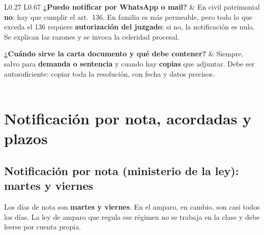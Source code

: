\documentclass[12pt,oneside]{book}
\begin{document}
\begin{longtable}{L{0.27\textwidth} L{0.67\textwidth}}
\textbf{¿Puedo notificar por WhatsApp o mail?} &
En civil patrimonial \textbf{no}: hay que cumplir el art.\ 136. En familia es más permeable, pero todo lo que exceda el 136 requiere \textbf{autorización del juzgado}; si no, la notificación es nula. Se explican las razones y se invoca la celeridad procesal. \\
\addlinespace

\textbf{¿Cuándo sirve la carta documento y qué debe contener?} &
Siempre, salvo para \textbf{demanda o sentencia} y cuando hay \textbf{copias} que adjuntar. Debe ser autosuficiente: copiar toda la resolución, con fecha y datos precisos. \\

\midrule
{} \\
\bottomrule
\end{longtable}

\chapter[Notificación por nota, acordadas y plazos]{Notificación por nota, acordadas y plazos}

\section{Notificación por nota (ministerio de la ley): martes y viernes}

Los días de nota son \textbf{martes y viernes}. En el amparo, en cambio, son casi todos los días. La ley de amparo que regula ese régimen no se trabaja en la clase y debe leerse por cuenta propia.
\end{document}
